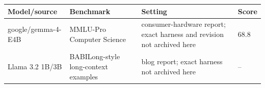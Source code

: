 \begin{tabular}{llll}
\toprule
Model/source & Benchmark & Setting & Score \\
\midrule
google/gemma-4-E4B & MMLU-Pro Computer Science & consumer-hardware report; exact harness and revision not archived here & 68.8 \\
Llama 3.2 1B/3B & BABILong-style long-context examples & blog report; exact harness not archived here & -- \\
\bottomrule
\end{tabular}
